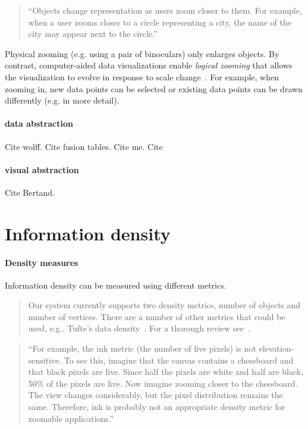 \documentclass[11pt, oneside]{report}   	%
\begin{document}
\begin{quote}
``Objects change representation as users zoom closer to them. For example, when a user zooms closer to a circle representing a city, the name of the city may appear next to the circle.''
\end{quote}

Physical zooming (e.g. using a pair of binoculars) only enlarges objects. By contrast, computer-aided data visualizations enable \emph{logical zooming} that allows the visualization to evolve in response to scale change~\cite{van1990reactive}. For example, when zooming in, new data points can be selected or existing data points can be drawn differently (e.g. in more detail).

\paragraph{data abstraction}

Cite wolff. Cite fusion tables. Cite me. Cite 

\paragraph{visual abstraction}

Cite Bertand.

\section{Information density}

\paragraph{Density measures}

Information density can be measured using different metrics.

\begin{quote}
Our system currently supports two density metrics, number of objects and number of vertices. There are a number of other metrics that could be used, e.g., Tufte's data density~\cite{tufte1983visual}. For a thorough review see~\cite{nickerson1994visual}.
\end{quote}

\begin{quote}
``For example, the ink metric (the number of live pixels) is not elevation-sensitive. To see this, imagine that the canvas contains a chessboard and that black pixels are live. Since half the pixels are white and half are black, 50\% of the pixels are live. Now imagine zooming closer to the chessboard. The view changes considerably, but the pixel distribution remains the same. Therefore, ink is probably not an appropriate density metric for zoomable applications.''
\end{quote}
\end{document}
